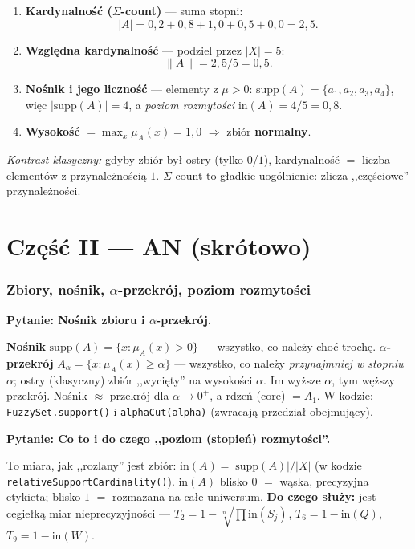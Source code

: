 \documentclass[11pt]{article}
\newcommand{\code}[1]{\texttt{#1}}
\newcommand{\inn}{\ensuremath{\mathrm{in}}}
\newcommand{\pytan}[1]{\medskip\noindent\textbf{\textcolor{anbg}{Pytanie:} #1}\par\smallskip}
\begin{document}
\begin{enumerate}[leftmargin=*]
\item \textbf{Kardynalność ($\Sigma$-count)} --- suma stopni:
  \[
    |A| = 0{,}2+0{,}8+1{,}0+0{,}5+0{,}0 = \boxed{2{,}5}.
  \]
\item \textbf{Względna kardynalność} --- podziel przez $|X|=5$:
  \[
    \|A\| = 2{,}5/5 = \boxed{0{,}5}.
  \]
\item \textbf{Nośnik i jego liczność} --- elementy z $\mu>0$:
  $\text{supp}(A)=\{a_1,a_2,a_3,a_4\}$, więc $|\text{supp}(A)|=4$, a
  \emph{poziom rozmytości} $\inn(A)=4/5=0{,}8$.
\item \textbf{Wysokość} $=\max_x\mu_A(x)=1{,}0$ $\Rightarrow$ zbiór \textbf{normalny}.
\end{enumerate}

\noindent\emph{Kontrast klasyczny:} gdyby zbiór był ostry (tylko $0$/$1$), kardynalność
$=$ liczba elementów z przynależnością $1$. $\Sigma$-count to gładkie uogólnienie: zlicza
,,częściowe'' przynależności.

\part*{Część II --- AN (skrótowo)}

\section{Zbiory, nośnik, $\alpha$-przekrój, poziom rozmytości}

\pytan{Nośnik zbioru i $\alpha$-przekrój.}
\textbf{Nośnik} $\text{supp}(A)=\{x:\mu_A(x)>0\}$ --- wszystko, co należy choć trochę.
\textbf{$\alpha$-przekrój} $A_\alpha=\{x:\mu_A(x)\ge\alpha\}$ --- wszystko, co należy
\emph{przynajmniej w stopniu $\alpha$}; ostry (klasyczny) zbiór ,,wycięty'' na wysokości
$\alpha$. Im wyższe $\alpha$, tym węższy przekrój. Nośnik $\approx$ przekrój dla $\alpha\to
0^+$, a rdzeń (core) $=A_1$. W kodzie: \code{FuzzySet.support()} i \code{alphaCut(alpha)}
(zwracają przedział obejmujący).

\pytan{Co to i do czego ,,poziom (stopień) rozmytości''.}
\label{sec:fuzziness}
To miara, jak ,,rozlany'' jest zbiór: $\inn(A)=|\text{supp}(A)|/|X|$ (w kodzie
\code{relativeSupportCardinality()}). $\inn(A)$ blisko $0$ $=$ wąska, precyzyjna etykieta;
blisko $1$ $=$ rozmazana na całe uniwersum. \textbf{Do czego służy:} jest cegiełką miar
nieprecyzyjności --- $T_2=1-\sqrt[n]{\prod \inn(S_j)}$, $T_6=1-\inn(Q)$, $T_9=1-\inn(W)$.
\end{document}
